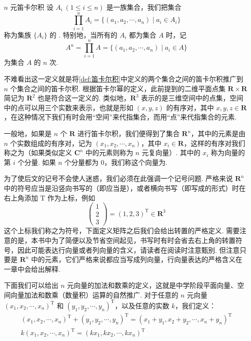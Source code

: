 \begin{definition}{$n$ 元笛卡尔积}{}
    设 $A_i~(1\leqslant i\leqslant n)$ 是一族集合，我们把集合
    \[
    \prod_{i=1}^n A_i = \{(a_1, a_2, \cdots, a_n) \mid a_i\in A_i\}
    \]
    称为集族 $\{A_i\}$ 的 . 特别地，当所有的 $A_i$ 都为集合 $A$ 时，记
    \[
    A^n = \prod_{i=1}^n A = \{(a_1, a_2, \cdots, a_n) \mid a_i \in A\}
    \]
    为集合 $A$ 的 $n$ 次.
\end{definition}

不难看出这一定义就是将\autoref{def:笛卡尔积}中定义的两个集合之间的笛卡尔积推广到 $n$ 个集合之间的笛卡尔积. 根据笛卡尔幂的定义，此前提到的二维平面点集 $\mathbf{R} \times \mathbf{R}$ 简记为 $\mathbf{R}^2$ 也是符合这一定义的. 类似地，$\mathbf{R}^3$ 表示的是三维空间中的点集，空间中的点可以用三个实数来表示，也就是形如 $(x, y, z)$ 的有序对，其中 $x, y, z \in \mathbf{R}$，在这种情况下我们有时会用``空间''来代指集合，而用``点''来代指集合的元素.

一般地，如果是 $n$ 个 $\mathbf{R}$ 进行笛卡尔积，我们便得到了集合 $\mathbf{R}^n$，其中的元素是由 $n$ 个实数组成的有序对，记为 $(x_1, x_2, \cdots, x_n)$，其中 $x_i \in \mathbf{R}$，这样的有序对我们称之为（如果类似定义 $\mathbf{C}^n$ 中的元素则称为 $n$ 元复向量）. 其中的 $x_i$ 称为向量的第 $i$ 个分量. 如果 $n$ 个分量都为 $0$，我们称这个向量为.

为了使后文的记号不会使人迷惑，我们必须在此强调一个记号问题. 严格来说 $\mathbf{R}^n$ 中的符号应当是沿竖向书写的（即应当是），或者横向书写（即写成的形式）时在右上角添加 $\mathrm{T}$ 作为上标，例如
\[
\begin{pmatrix}
    1 \\ 2 \\ 3
\end{pmatrix} = (1, 2, 3)^{\mathrm{T}} \in \mathbf{R}^3
\]
这个上标我们称之为符号，下面定义矩阵之后我们会给出转置的严格定义. 需要注意的是，本书中为了简便以及节省空间起见，书写时有时会省去右上角的转置符号，因此可能表达行向量或者列向量的含义，请读者在阅读时注意甄别. 但注意只要是 $\mathbf{R}^n$ 中的元素，它们严格来说都应当写成列向量，行向量表达的严格含义在一章中会给出解释.

下面我们可以给出 $n$ 元向量的加法和数乘的定义，这就是中学阶段平面向量、空间向量加法和数乘（数量积）运算的自然推广. 对于任意的 $n$ 元向量 $(x_1, x_2, \cdots, x_n)^\mathrm{T}$ 和 $(y_1, y_2, \cdots, y_n)^\mathrm{T}$，以及任意的实数 $k$，我们定义：
\begin{gather*}
    (x_1, x_2, \cdots, x_n)^\mathrm{T} + (y_1, y_2, \cdots, y_n)^\mathrm{T} = (x_1+y_1, x_2+y_2, \cdots, x_n+y_n)^\mathrm{T} \\
    k(x_1, x_2, \cdots, x_n)^\mathrm{T} = (kx_1, kx_2, \cdots, kx_n)^\mathrm{T}
\end{gather*}

